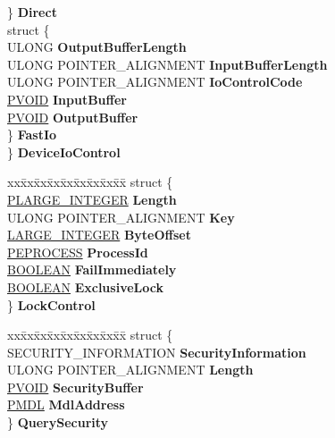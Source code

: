 \begin{DoxyCompactItemize}
\begin{tabbing}
\>\} {\bfseries Direct}\\
\>struct \{\\
\>\>ULONG {\bfseries OutputBufferLength}\\
\>\>ULONG POINTER\_ALIGNMENT {\bfseries InputBufferLength}\\
\>\>ULONG POINTER\_ALIGNMENT {\bfseries IoControlCode}\\
\>\>\hyperlink{interfacevoid}{PVOID} {\bfseries InputBuffer}\\
\>\>\hyperlink{interfacevoid}{PVOID} {\bfseries OutputBuffer}\\
\>\} {\bfseries FastIo}\\
\} {\bfseries DeviceIoControl}\\

\end{tabbing}\item 
\mbox{\label{union___f_l_t___p_a_r_a_m_e_t_e_r_s_a060fb4b8638688657e45d99275b0b51c}} 
\begin{tabbing}
xx\=xx\=xx\=xx\=xx\=xx\=xx\=xx\=xx\=\kill
struct \{\\
\>\hyperlink{union___l_a_r_g_e___i_n_t_e_g_e_r}{PLARGE\_INTEGER} {\bfseries Length}\\
\>ULONG POINTER\_ALIGNMENT {\bfseries Key}\\
\>\hyperlink{union___l_a_r_g_e___i_n_t_e_g_e_r}{LARGE\_INTEGER} {\bfseries ByteOffset}\\
\>\hyperlink{struct___e_p_r_o_c_e_s_s}{PEPROCESS} {\bfseries ProcessId}\\
\>\hyperlink{_processor_bind_8h_a112e3146cb38b6ee95e64d85842e380a}{BOOLEAN} {\bfseries FailImmediately}\\
\>\hyperlink{_processor_bind_8h_a112e3146cb38b6ee95e64d85842e380a}{BOOLEAN} {\bfseries ExclusiveLock}\\
\} {\bfseries LockControl}\\

\end{tabbing}\item 
\mbox{\label{union___f_l_t___p_a_r_a_m_e_t_e_r_s_a404d5829617507d33afe227fec295aeb}} 
\begin{tabbing}
xx\=xx\=xx\=xx\=xx\=xx\=xx\=xx\=xx\=\kill
struct \{\\
\>SECURITY\_INFORMATION {\bfseries SecurityInformation}\\
\>ULONG POINTER\_ALIGNMENT {\bfseries Length}\\
\>\hyperlink{interfacevoid}{PVOID} {\bfseries SecurityBuffer}\\
\>\hyperlink{interfacevoid}{PMDL} {\bfseries MdlAddress}\\
\} {\bfseries QuerySecurity}\\


\end{tabbing}
\end{DoxyCompactItemize}
